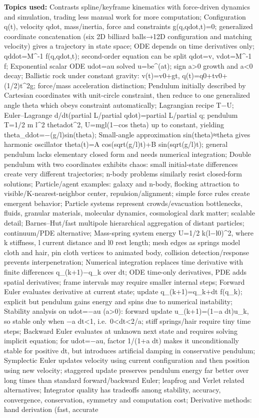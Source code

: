 \textbf{Topics used:} Contrasts spline/keyframe kinematics with force-driven dynamics and simulation, trading less manual work for more computation; Configuration q(t), velocity qdot, mass/inertia, force and constraints g(q,qdot,t)=0; generalized coordinate concatenation (six 2D billiard balls→12D configuration and matching velocity) gives a trajectory in state space; ODE depends on time derivatives only; qddot=M\^{}-1 f(q,qdot,t); second-order equation can be split qdot=v, vdot=M\^{}-1 f; Exponential scalar ODE udot=au solved u=be\^{}(at); sign a\textgreater0 growth and a\textless0 decay; Ballistic rock under constant gravity: v(t)=v0+gt, q(t)=q0+tv0+(1/2)t\^{}2g; force/mass acceleration distinction; Pendulum initially described by Cartesian coordinates with unit-circle constraint, then reduce to one generalized angle theta which obeys constraint automatically; Lagrangian recipe T−U; Euler--Lagrange d/dt(partial L/partial qdot)=partial L/partial q; pendulum T=1/2 m l\^{}2 thetadot\^{}2, U=mgl(1−cos theta) up to constant, yielding theta\_ddot=−(g/l)sin(theta); Small-angle approximation sin(theta)≈theta gives harmonic oscillator theta(t)=A cos(sqrt(g/l)t)+B sin(sqrt(g/l)t); general pendulum lacks elementary closed form and needs numerical integration; Double pendulum with two coordinates exhibits chaos: small initial-state differences create very different trajectories; n-body problems similarly resist closed-form solutions; Particle/agent examples: galaxy and n-body, flocking attraction to visible/K-nearest-neighbor center, repulsion/alignment; simple force rules create emergent behavior; Particle systems represent crowds/evacuation bottlenecks, fluids, granular materials, molecular dynamics, cosmological dark matter; scalable detail; Barnes--Hut/fast multipole hierarchical aggregation of distant particles; continuum/PDE alternative; Mass-spring system energy U=1/2 k(l−l0)\^{}2, where k stiffness, l current distance and l0 rest length; mesh edges as springs model cloth and hair, pin cloth vertices to animated body, collision detection/response prevents interpenetration; Numerical integration replaces time derivative with finite differences q\_(k+1)−q\_k over dt; ODE time-only derivatives, PDE adds spatial derivatives; frame intervals may require smaller internal steps; Forward Euler evaluates derivative at current state; update q\_(k+1)=q\_k+dt f(q\_k); explicit but pendulum gains energy and spins due to numerical instability; Stability analysis on udot=−au (a\textgreater0): forward update u\_(k+1)=(1−a dt)u\_k, so stable only when −a dt\textbar\textless1, i.e.~0\textless dt\textless2/a; stiff springs/hair require tiny time steps; Backward Euler evaluates at unknown next state and requires solving implicit equation; for udot=−au, factor 1/(1+a dt) makes it unconditionally stable for positive dt, but introduces artificial damping in conservative pendulum; Symplectic Euler updates velocity using current configuration and then position using new velocity; staggered update preserves pendulum energy far better over long times than standard forward/backward Euler; leapfrog and Verlet related alternatives; Integrator quality has tradeoffs among stability, accuracy, convergence, conservation, symmetry and computation cost; Derivative methods: hand derivation (fast, accurate 
